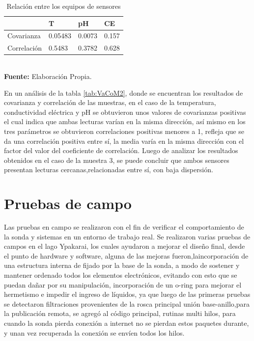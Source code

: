\begin{table}[H]
\caption{Relaci\'on entre los equipos de sensores}
\label{tab:VaCoM3}
\centering
\begin{tabular}{llll} 
\toprule
& T   &  pH    & CE \\
\midrule
Covarianza  & 0.05483 & 0.0073 & 0.157                \\
Correlación & 0.5483& 0.3782 & 0.628        \\
\bottomrule
\end{tabular}
\\ \textbf{Fuente: }Elaboración Propia.
\end{table}  

En un an\'alisis de la tabla \ref{tab:VaCoM2}, donde se encuentran los resultados de covarianza y correlación de las muestras, en el caso de la temperatura, conductividad el\'ectrica y pH se obtuvieron unos valores de covarianzas positivas el cual indica que ambas lecturas varían en la misma dirección, as\'i mismo en los tres par\'ametros se obtuvieron correlaciones positivas menores a 1, refleja que se da una correlación positiva entre sí, la media varía en la misma dirección con el factor del valor del coeficiente de correlación. Luego de analizar los resultados obtenidos en el caso de la muestra 3, se puede concluir que ambos sensores presentan lecturas cercanas,relacionadas entre s\'i, con baja dispersi\'on. 



\section{Pruebas de campo}
Las pruebas en campo se realizaron con el fin de verificar el comportamiento de la sonda y sistemas en un entorno de trabajo real. 
Se realizaron varias pruebas de campos en el lago Ypakarai, los cuales ayudaron a mejorar el dise\~no final, desde el punto de hardware y software, alguna de las mejoras fueron,laincorporaci\'on de una estructura interna de fijado por la base de la sonda, a modo de sostener y mantener ordenado todos los elementos electr\'onicos, evitando con esto que se puedan da\~nar por su manipulaci\'on, incorporaci\'on de un o-ring para mejorar el hermetismo e impedir el ingreso de l\'iquidos, ya que luego de las primeras pruebas se detectaron filtraciones provenientes de la rosca principal uni\'on base-anillo,para la publicaci\'on remota, se agreg\'o al c\'odigo principal, rutinas multi hilos, para cuando la sonda pierda conexi\'on a internet no se pierdan estos paquetes durante, y unan vez recuperada la conexi\'on se env\'ien todos los hilos.

